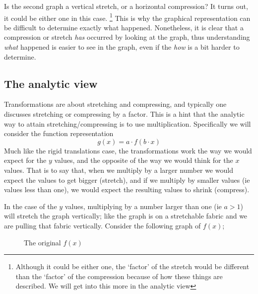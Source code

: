 \documentclass{ximeraXloud}
\begin{document}
    Is the second graph a vertical stretch, or a horizontal compression? It turns out, it could be either one in this case.%
    \footnote{%
        Although it could be either one, the `factor' of the stretch would be different than the `factor' of the compression because of how these things are described. We will get into this more in the analytic view%
        }
    This is why the graphical representation can be difficult to determine exactly what happened. Nonetheless, it is clear that a compression or stretch \textit{has} occurred by looking at the graph, thus understanding \textit{what} happened is easier to see in the graph, even if the \textit{how} is a bit harder to determine.

\subsection*{The analytic view}
    Transformations are about stretching and compressing, and typically one discusses stretching or compressing by a factor. This is a hint that the analytic way to attain stretching/compressing is to use multiplication. Specifically we will consider the function representation
    \[
        g(x) = a \cdot f(b\cdot x)
    \]
    Much like the rigid translations case, the transformations work the way we would expect for the $y$ values, and the opposite of the way we would think for the $x$ values. That is to say that, when we multiply by a larger number we would expect the values to get bigger (stretch), and if we multiply by smaller values (ie values less than one), we would expect the resulting values to shrink (compress).
    
    In the case of the $y$ values, multiplying by a number larger than one (ie $a > 1$) will stretch the graph vertically; like the graph is on a stretchable fabric and we are pulling that fabric vertically. Consider the following graph of $f(x)$;
    
    \begin{figure}[H]\centering
        \caption{The original $f(x)$}
    \end{figure}
    
\end{document}
